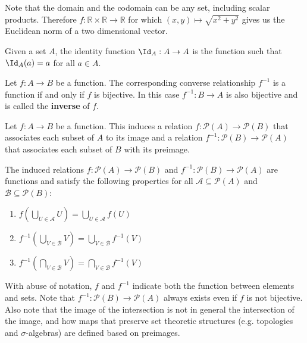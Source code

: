 \documentclass{bareminimum}
\begin{document}
\begin{remark}
	Note that the domain and the codomain can be any set, including scalar products. Therefore $f : \mathbb{R} \times \mathbb{R} \to \mathbb{R}$ for which $(x,y) \mapsto \sqrt{x^2 + y^2}$ gives us the Euclidean norm of a two dimensional vector.
\end{remark}

\begin{defn}
	Given a set $A$,  the identity function $\Id_A : A \to A$ is the function such that $\Id_A(a) = a$ for all $a \in A$.
\end{defn}

\begin{prop}
	Let $f : A \to B$  be a function. The corresponding converse relationship $f^{-1}$ is a function if and only if $f$ is bijective. In this case $f^{-1} : B \to A$ is also bijective and is called the \textbf{inverse} of $f$.
\end{prop}

\begin{defn}
	Let $f : A \to B$  be a function. This induces a relation $f : \mathcal{P}(A) \to \mathcal{P}(B)$ that associates each subset of $A$ to its image and a relation $f^{-1} : \mathcal{P}(B) \to \mathcal{P}(A)$ that associates each subset of $B$ with its preimage.
\end{defn}

\begin{prop}
	The induced relations $f : \mathcal{P}(A) \to \mathcal{P}(B)$ and $f^{-1} : \mathcal{P}(B) \to \mathcal{P}(A)$ are functions and satisfy the following properties for all $\mathcal{A} \subseteq \mathcal{P}(A)$ and $\mathcal{B} \subseteq \mathcal{P}(B)$:
	\begin{enumerate}
		\item $f(\bigcup\limits_{U \in \mathcal{A}} U) = \bigcup\limits_{U \in \mathcal{A}} f(U)$
		\item $f^{-1}(\bigcup\limits_{V \in \mathcal{B}} V) = \bigcup\limits_{V \in \mathcal{B}} f^{-1}(V)$
		\item $f^{-1}(\bigcap\limits_{V \in \mathcal{B}} V) = \bigcap\limits_{V \in \mathcal{B}} f^{-1}(V)$
	\end{enumerate}
\end{prop}

\begin{remark}
	With abuse of notation, $f$ and $f^{-1}$ indicate both the function between elements and sets. Note that $f^{-1} : \mathcal{P}(B) \to \mathcal{P}(A)$ always exists even if $f$ is not bijective. Also note that the image of the intersection is not in general the intersection of the image, and how maps that preserve set theoretic structures (e.g. topologies and $\sigma$-algebras) are defined based on preimages.
\end{remark}
\end{document}
